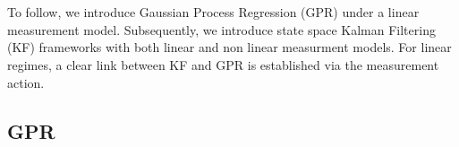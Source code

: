 \\
\\
To follow, we introduce Gaussian Process Regression (GPR) under a linear measurement model. Subsequently, we introduce state space Kalman Filtering (KF) frameworks with both linear and non linear measurment models. For linear regimes, a clear link between KF and GPR is established via the measurement action. 

\subsection{GPR}

